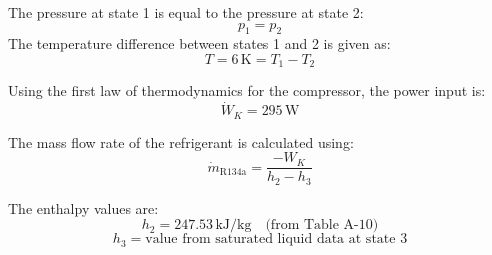 The pressure at state 1 is equal to the pressure at state 2:  
\[
p_1 = p_2
\]  
The temperature difference between states 1 and 2 is given as:  
\[
T = 6 \, \text{K} = T_1 - T_2
\]  

Using the first law of thermodynamics for the compressor, the power input is:  
\[
\dot{W}_K = 295 \, \text{W}
\]  

The mass flow rate of the refrigerant is calculated using:  
\[
\dot{m}_{\text{R134a}} = \frac{-W_K}{h_2 - h_3}
\]  

The enthalpy values are:  
\[
h_2 = 247.53 \, \text{kJ/kg} \quad \text{(from Table A-10)}
\]  
\[
h_3 = \text{value from saturated liquid data at state 3}
\]